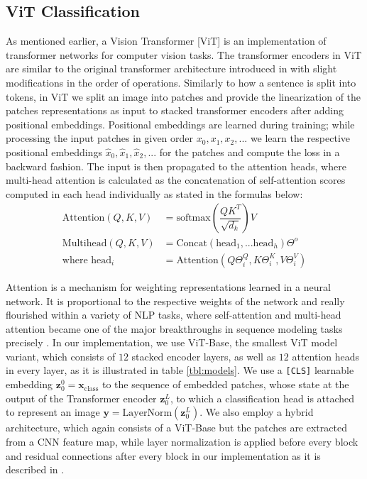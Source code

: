 \subsection{ViT Classification}
\label{sub:3.1}
As mentioned earlier, a Vision Transformer [ViT] \cite{visiontransformer} is an implementation of transformer networks for computer vision tasks. The transformer encoders in ViT are similar to the original transformer architecture introduced in \cite{vaswani2017attention} with slight modifications in the order of operations. Similarly to how a sentence is split into tokens, in ViT we split an image into patches and provide the linearization of the patches representations as input to stacked transformer encoders after adding positional embeddings. Positional embeddings are learned during training; while processing the input patches in given order $x_0, x_1, x_2, ...$ we learn the respective positional embeddings $\hat{x}_0, \hat{x}_1, \hat{x}_2, ...$ for the patches and compute the loss in a backward fashion. The input is then propagated to the attention heads, where multi-head attention is calculated as the concatenation of self-attention scores computed in each head individually as stated in the formulas below:
\begin{align*}
\text{Attention}(Q, K, V) &= \text{softmax}\left(\dfrac{QK^T}{\sqrt{d_k}}\right)V\\
\text{Multihead}(Q, K, V) &= \text{Concat}(\text{head}_1,...\text{head}_h)\Theta^o \\
\text{where head}_i &= \text{Attention}(Q\Theta_i^Q, K\Theta_i^K, V\Theta_i^V)
\end{align*}

Attention is a mechanism for weighting representations learned in a neural network. It is proportional to the respective weights of the network and really flourished within a variety of NLP tasks, where self-attention and multi-head attention became one of the major breakthroughs in sequence modeling tasks precisely \cite{guidedtransformer}. In our implementation, we use ViT-Base, the smallest ViT model variant, which consists of $12$ stacked encoder layers, as well as $12$ attention heads in every layer, as it is illustrated in table \ref{tbl:models}. We use a \texttt{[CLS]} learnable embedding $\mathbf{z}_0^0
= \mathbf{x}_{\text{class}}$ to the sequence of embedded patches, whose state at the output of the Transformer encoder $\mathbf{z}_0^L$, to which a classification head is attached to represent an image $\mathbf{y} = \text{LayerNorm}(\mathbf{z}_0^L)$. We also employ a hybrid architecture, which again consists of a ViT-Base but the patches are extracted from a CNN feature map, while layer normalization is applied before
every block and residual connections after every block in our implementation as it is described in \cite{visiontransformer}.

